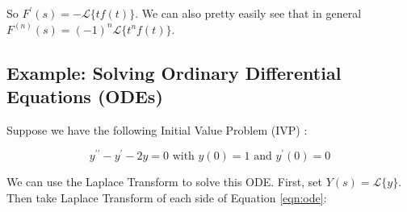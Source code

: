 \documentclass{article}
\theoremstyle{definition}
\begin{document}
\bigskip
\noindent
So $F^\prime(s) = -\mathcal{L}\{tf(t)\}$. We can also pretty easily see that in general $F^{(n)}(s) = (-1)^n \mathcal{L}\{t^n f(t)\}$.


\subsection{Example: Solving Ordinary Differential Equations (ODEs)}
\label{sec:example_ode}
\bigskip
\noindent
Suppose we have the following Initial Value Problem (IVP)  \cite{wiki:initial_value_problem}:

\smallskip
\begin{equation}
y^{\prime \prime} - y^\prime -2y = 0 \text{ with $y(0) = 1$ and $y^\prime (0) = 0$}
\label{eqn:ode}
\end{equation}

\bigskip
\noindent
We can use the Laplace Transform to solve this ODE. First, set $Y(s) = \mathcal{L}\{y\}$. Then take Laplace Transform of each side of Equation \ref{eqn:ode}: 
\end{document}
